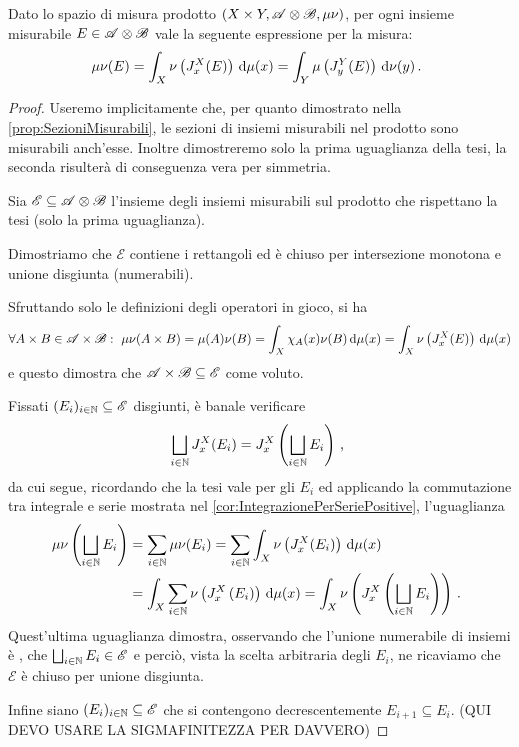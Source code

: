 \begin{proposition}\label{prop:PreTonelli}
	Dato lo spazio di misura prodotto $(X\times Y,\mathscr A\otimes\mathscr B,\mu\nu)$, per ogni insieme misurabile $E\in\mathscr A\otimes\mathscr B$ \sigfin[o] vale la seguente espressione per la misura:
	\begin{equation*}
		\mu\nu(E)=\int_X\nu\left(J_x^X(E)\right)\,\mathrm d\mu(x)=\int_Y\mu\left(J_y^Y(E)\right)\,\mathrm d\nu(y)\, \text{. }
	\end{equation*}
\end{proposition}
\begin{proof}
	\newcommand{\E}{\ensuremath{\mathscr E}}
	Useremo implicitamente che, per quanto dimostrato nella \cref{prop:SezioniMisurabili}, le sezioni di insiemi misurabili nel prodotto sono misurabili anch'esse.
	Inoltre dimostreremo solo la prima uguaglianza della tesi, la seconda risulterà di conseguenza vera per simmetria.
	
	Sia $\E\subseteq \A\otimes\B$ l'insieme degli insiemi misurabili sul prodotto \sigfin[i] che rispettano la tesi (solo la prima uguaglianza).
	
	Dimostriamo che $\E$ contiene i rettangoli ed è chiuso per intersezione monotona e unione disgiunta (numerabili).
	
	Sfruttando solo le definizioni degli operatori in gioco, si ha
	\begin{equation*}
		\forall A\times B\in\mathscr A\times\mathscr B:\ \mu\nu(A\times B)=\mu(A)\nu(B)=\int_X \chi_A(x)\nu(B)\,\mathrm d\mu(x)=\int_X\nu\left(J_x^X(E)\right)\,\mathrm d\mu(x)
	\end{equation*}
	e questo dimostra che $\A\times\B\subseteq \E$ come voluto.
	
	Fissati $(E_i)_{i\in\N}\subseteq \E$ disgiunti, è banale verificare
	\begin{equation*}
		\bigsqcup_{i\in\mathbb N}J_x^X(E_i)=J_x^X\left(\bigsqcup_{i\in\mathbb N}E_i\right)\, \text{, }
	\end{equation*}
	da cui segue, ricordando che la tesi vale per gli $E_i$ ed applicando la commutazione tra integrale e serie mostrata nel \cref{cor:IntegrazionePerSeriePositive}, l'uguaglianza
	\begin{align*}
		\mu\nu\left(\bigsqcup_{i\in\mathbb N}E_i\right)&=\sum_{i\in\mathbb N}\mu\nu(E_i)=\sum_{i\in\mathbb N}\int_X \nu\left(J_x^X(E_i)\right)\,\mathrm d\mu(x)\\
		&=\int_X\sum_{i\in\mathbb N}\nu\left(J_x^X\left(E_i\right)\right)\,\mathrm d\mu(x)=\int_X\nu\left(J_x^X\left(\bigsqcup_{i\in\mathbb N}E_i\right)\right)\, \text{. }
	\end{align*}
	Quest'ultima uguaglianza dimostra, osservando che l'unione numerabile di insiemi \sigfin[i] è \sigfin[a], che $\bigsqcup_{i\in\N}E_i\in\E$ e perciò, vista la scelta arbitraria degli $E_i$, ne ricaviamo che $\E$ è chiuso per unione disgiunta.
	
	Infine siano $(E_i)_{i\in\N}\subseteq \E$ che si contengono decrescentemente $E_{i+1}\subseteq E_i$. (QUI DEVO USARE LA SIGMAFINITEZZA PER DAVVERO)
\end{proof}


